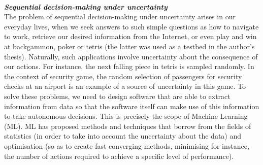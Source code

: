 \noindent \textbf{\textit{\\Sequential decision-making under uncertainty}}\\
The problem of sequential decision-making under uncertainty arises in our everyday lives, when we seek answers to such simple questions as how to navigate to work, retrieve our desired information from the Internet, or even
play and win at backgammon, poker or tetris (the latter was used as a testbed in the author's thesis). Naturally, such applications involve uncertainty about the consequence of our actions. For instance, the next falling piece in tetris is sampled randomly. In the context of security game, the random selection of passengers for security checks at an airport is an example of a source of uncertainty in this  game.  
To solve these problems, we need to  design software that are able to extract information from data so that the software itself can make use of this information to take  autonomous decisions. This is precisely the scope of Machine Learning (ML).
ML has proposed methods and techniques that borrow from the fields of statistics (in order to take into account the uncertainty about the data) and optimisation (so as to create fast converging methods, minimising for instance, the number of actions required to achieve a specific level of performance). %


